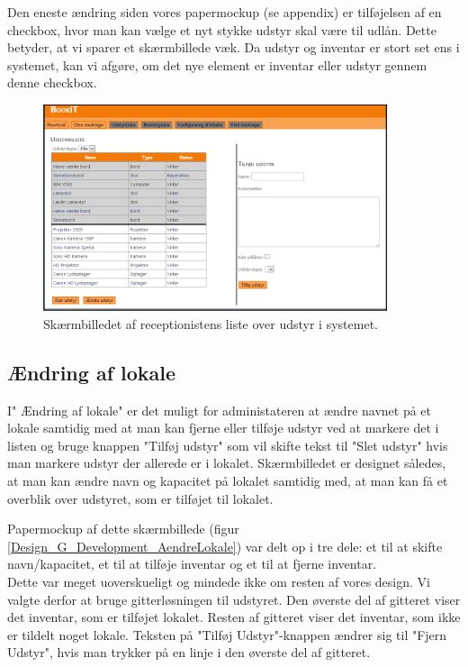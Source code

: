 Den eneste ændring siden vores papermockup (se appendix) er tilføjelsen af en checkbox, hvor man kan vælge et nyt stykke udstyr skal være til udlån. Dette betyder, at vi sparer et skærmbillede væk. Da udstyr og inventar er stort set ens i systemet, kan vi afgøre, om det nye element er inventar eller udstyr gennem denne checkbox.

\begin{figure}[h!]
  \centering
    \includegraphics[width=0.9\textwidth]{Appendix/GUI-Prototype/DigitalMockup/UdstyrsListe}
  \caption{Skærmbilledet af receptionistens liste over udstyr i systemet.}
\label{Design_G_Development_UdstyrsListe_Final}
\end{figure} 

\subsection{Ændring af lokale}
I" Ændring af lokale" er det muligt for administateren at ændre navnet på et lokale samtidig med at man kan fjerne eller tilføje udstyr ved at markere det i listen og bruge knappen "Tilføj udstyr" som vil skifte tekst til "Slet udstyr" hvis man markere udstyr der allerede er i lokalet.
Skærmbilledet er designet således, at man kan ændre navn og kapacitet på lokalet samtidig med, at man kan få et overblik over udstyret, som er tilføjet til lokalet.

Papermockup af dette skærmbillede (figur \ref{Design_G_Development_AendreLokale}) var delt op i tre dele: et til at skifte navn/kapacitet, et til at tilføje inventar og et til at fjerne inventar.
\\Dette var meget uoverskueligt og mindede ikke om resten af vores design. Vi valgte derfor at bruge gitterløsningen til udstyret. Den øverste del af gitteret viser det inventar, som er tilføjet lokalet. Resten af gitteret viser det inventar, som ikke er tildelt noget lokale. Teksten på "Tilføj Udstyr"-knappen ændrer sig til "Fjern Udstyr", hvis man trykker på en linje i den øverste del af gitteret.

